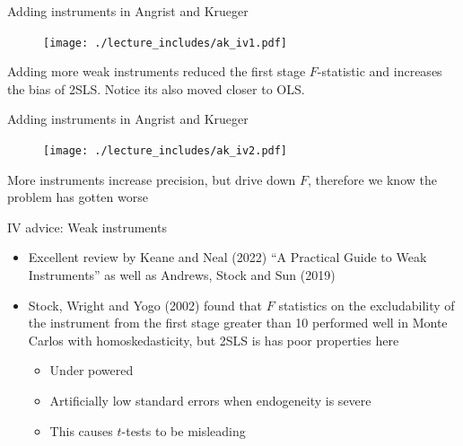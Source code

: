 \documentclass{beamer}
\begin{document}
\begin{frame}{Adding instruments in Angrist and Krueger}
	
	\begin{figure}
	\texttt{[image: ./lecture\_includes/ak\_iv1.pdf]}
	\end{figure}
	
Adding more weak instruments reduced the first stage $F$-statistic and increases the bias of 2SLS. Notice its also moved closer to OLS. 
	
\end{frame}

\begin{frame}{Adding instruments in Angrist and Krueger}
	
	\begin{figure}
	\texttt{[image: ./lecture\_includes/ak\_iv2.pdf]}
	\end{figure}
	
More instruments increase precision, but drive down $F$, therefore we know the problem has gotten worse
	
\end{frame}




\begin{frame}{IV advice: Weak instruments}

	\begin{itemize}
	\item Excellent review by Keane and Neal (2022) ``A Practical Guide to Weak Instruments''  as well as Andrews, Stock and Sun (2019)
	\item Stock, Wright and Yogo (2002) found that $F$ statistics on the excludability of the instrument from the first stage greater than 10 performed well in Monte Carlos with homoskedasticity, but 2SLS is has poor properties here
		\begin{itemize}
		\item Under powered
		\item Artificially low standard errors when endogeneity is severe
		\item This causes $t$-tests to be misleading
		\end{itemize}
	\end{itemize}

\end{frame}
\end{document}
